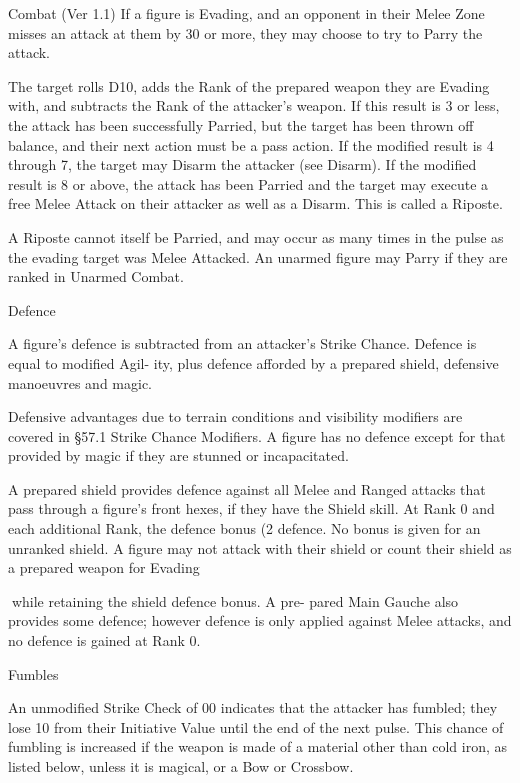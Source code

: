 \begin{Chapter}{Combat (Ver 1.1)}
If  a  figure  is  Evading,  and  an  opponent  in  their 
Melee  Zone  misses  an  attack  at  them  by  30  or 
more, they may choose to try to Parry the attack. 

The target rolls D10, adds the Rank of the prepared 
weapon  they  are  Evading  with,  and  subtracts  the 
Rank of the attacker’s weapon. If this result is 3 or 
less,  the  attack  has  been  successfully  Parried,  but 
the  target  has  been  thrown  off  balance,  and  their 
next  action  must  be  a  pass  action.  If  the  modified 
result  is  4  through  7,  the  target  may  Disarm  the 
attacker (see Disarm). If the modified result is 8 or 
above,  the  attack  has  been  Parried  and  the  target 
may  execute  a  free  Melee  Attack  on their  attacker 
as well as a Disarm. This is called a Riposte. 

A  Riposte  cannot itself  be  Parried,  and  may  occur 
as  many  times  in  the  pulse  as  the  evading  target 
was Melee Attacked. An unarmed figure may Parry 
if they are ranked in Unarmed Combat. 

Defence 

A figure’s defence is subtracted from an attacker’s 
Strike Chance.  Defence  is  equal  to modified  Agil-
ity,  plus  defence  afforded  by  a  prepared  shield, 
defensive manoeuvres and magic. 

Defensive advantages due to terrain conditions and 
visibility  modifiers  are  covered  in  §57.1  Strike 
Chance Modifiers. A figure has no defence  except 
for  that  provided  by  magic  if  they  are  stunned  or 
incapacitated. 

A  prepared  shield  provides  defence  against  all 
Melee  and  Ranged  attacks  that  pass  through  a 
figure’s  front  hexes,  if  they  have  the  Shield  skill. 
At  Rank  0  and  each  additional  Rank,  the  defence 
bonus  (2%
defence. No bonus is given for an unranked shield. 
A  figure  may  not  attack  with their  shield  or  count 
their  shield  as  a  prepared  weapon  for  Evading 

while  retaining  the  shield  defence  bonus.  A  pre-
pared  Main  Gauche  also  provides  some  defence; 
however  defence  is  only  applied  against  Melee 
attacks, and no defence is gained at Rank 0. 

Fumbles 

An  unmodified  Strike  Check  of  00  indicates  that 
the  attacker  has  fumbled;  they  lose  10  from  their 
Initiative Value until the end of the next pulse. This 
chance  of  fumbling  is  increased  if  the  weapon  is 
made  of  a  material  other  than  cold  iron,  as  listed 
below, unless it is magical, or a Bow or  Crossbow. 


\end{Chapter}
